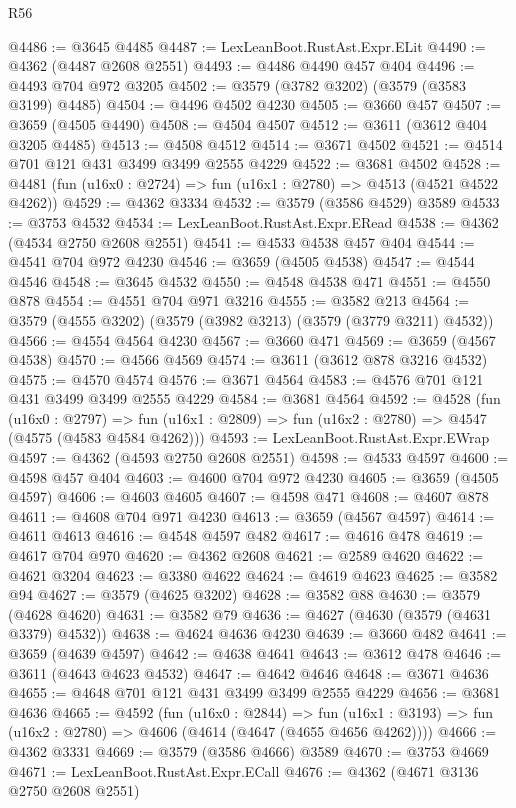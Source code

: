 \begin{lexlean}{R56}
\begin{coremodule}
@4486 := @3645 @4485
@4487 := LexLeanBoot.RustAst.Expr.ELit
@4490 := @4362 (@4487 @2608 @2551)
@4493 := @4486 @4490 @457 @404
@4496 := @4493 @704 @972 @3205
@4502 := @3579 (@3782 @3202) (@3579 (@3583 @3199) @4485)
@4504 := @4496 @4502 @4230
@4505 := @3660 @457
@4507 := @3659 (@4505 @4490)
@4508 := @4504 @4507
@4512 := @3611 (@3612 @404 @3205 @4485)
@4513 := @4508 @4512
@4514 := @3671 @4502
@4521 := @4514 @701 @121 @431 @3499 @3499 @2555 @4229
@4522 := @3681 @4502
@4528 := @4481 (fun (u16x0 : @2724) => fun (u16x1 : @2780) => @4513 (@4521 @4522 @4262))
@4529 := @4362 @3334
@4532 := @3579 (@3586 @4529) @3589
@4533 := @3753 @4532
@4534 := LexLeanBoot.RustAst.Expr.ERead
@4538 := @4362 (@4534 @2750 @2608 @2551)
@4541 := @4533 @4538 @457 @404
@4544 := @4541 @704 @972 @4230
@4546 := @3659 (@4505 @4538)
@4547 := @4544 @4546
@4548 := @3645 @4532
@4550 := @4548 @4538 @471
@4551 := @4550 @878
@4554 := @4551 @704 @971 @3216
@4555 := @3582 @213
@4564 := @3579 (@4555 @3202) (@3579 (@3982 @3213) (@3579 (@3779 @3211) @4532))
@4566 := @4554 @4564 @4230
@4567 := @3660 @471
@4569 := @3659 (@4567 @4538)
@4570 := @4566 @4569
@4574 := @3611 (@3612 @878 @3216 @4532)
@4575 := @4570 @4574
@4576 := @3671 @4564
@4583 := @4576 @701 @121 @431 @3499 @3499 @2555 @4229
@4584 := @3681 @4564
@4592 := @4528
    (fun (u16x0 : @2797) =>
    fun (u16x1 : @2809) => fun (u16x2 : @2780) => @4547 (@4575 (@4583 @4584 @4262)))
@4593 := LexLeanBoot.RustAst.Expr.EWrap
@4597 := @4362 (@4593 @2750 @2608 @2551)
@4598 := @4533 @4597
@4600 := @4598 @457 @404
@4603 := @4600 @704 @972 @4230
@4605 := @3659 (@4505 @4597)
@4606 := @4603 @4605
@4607 := @4598 @471
@4608 := @4607 @878
@4611 := @4608 @704 @971 @4230
@4613 := @3659 (@4567 @4597)
@4614 := @4611 @4613
@4616 := @4548 @4597 @482
@4617 := @4616 @478
@4619 := @4617 @704 @970
@4620 := @4362 @2608
@4621 := @2589 @4620
@4622 := @4621 @3204
@4623 := @3380 @4622
@4624 := @4619 @4623
@4625 := @3582 @94
@4627 := @3579 (@4625 @3202)
@4628 := @3582 @88
@4630 := @3579 (@4628 @4620)
@4631 := @3582 @79
@4636 := @4627 (@4630 (@3579 (@4631 @3379) @4532))
@4638 := @4624 @4636 @4230
@4639 := @3660 @482
@4641 := @3659 (@4639 @4597)
@4642 := @4638 @4641
@4643 := @3612 @478
@4646 := @3611 (@4643 @4623 @4532)
@4647 := @4642 @4646
@4648 := @3671 @4636
@4655 := @4648 @701 @121 @431 @3499 @3499 @2555 @4229
@4656 := @3681 @4636
@4665 := @4592
    (fun (u16x0 : @2844) =>
    fun (u16x1 : @3193) => fun (u16x2 : @2780) => @4606 (@4614 (@4647 (@4655 @4656 @4262))))
@4666 := @4362 @3331
@4669 := @3579 (@3586 @4666) @3589
@4670 := @3753 @4669
@4671 := LexLeanBoot.RustAst.Expr.ECall
@4676 := @4362 (@4671 @3136 @2750 @2608 @2551)

\end{coremodule}
\end{lexlean}
